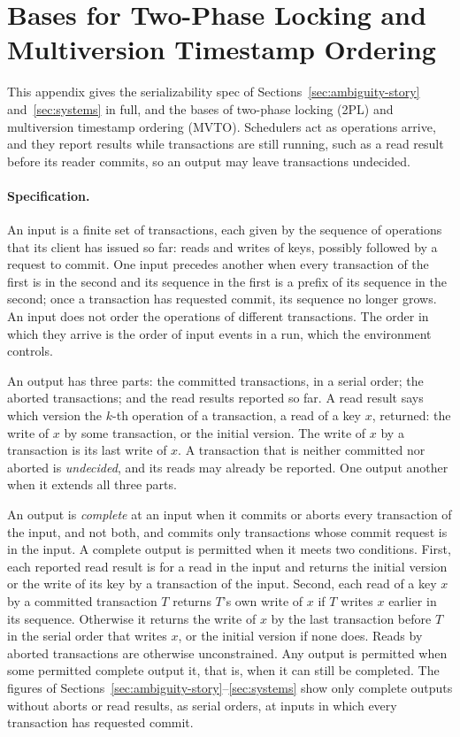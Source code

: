 \section{\Commitment Bases for Two-Phase Locking and Multiversion Timestamp Ordering}
\label{app:cc-bases}

This appendix gives the serializability spec of
Sections~\ref{sec:ambiguity-story} and~\ref{sec:systems} in full, and the
\commitment bases of two-phase locking (2PL) and multiversion timestamp ordering
(MVTO).  Schedulers act as operations arrive, and they report results while
transactions are still running, such as a read result before its reader
commits, so an output may leave transactions undecided.

\paragraph{Specification.}
An input is a finite set of transactions, each given by the sequence of
operations that its client has issued so far: reads and writes of keys,
possibly followed by a request to commit.  One input precedes another when
every transaction of the first is in the second and its sequence in the first
is a prefix of its sequence in the second; once a transaction has requested
commit, its sequence no longer grows.  An input does not order the operations
of different transactions.  The order in which they arrive is the order of
input events in a run, which the environment controls.

An output has three parts: the committed transactions, in a serial order; the
aborted transactions; and the read results reported so far.  A read result
says which version the $k$-th operation of a transaction, a read of a key $x$,
returned: the write of $x$ by some transaction, or the initial version.  The
write of $x$ by a transaction is its last write of $x$.  A transaction that is
neither committed nor aborted is \emph{undecided}, and its reads may already be
reported.  One output \outrel another when it extends all three parts.

An output is \emph{complete} at an input when it commits or aborts every
transaction of the input, and not both, and commits only transactions whose
commit request is in the input.  A complete output is permitted when it meets two
conditions.  First, each reported read result is for a read in the input and
returns the initial version or the write of its key by a transaction of the
input.  Second, each read of a key $x$ by a committed transaction $T$ returns
$T$'s own write of $x$ if $T$ writes $x$ earlier in its sequence.  Otherwise it
returns the write of $x$ by the last transaction before $T$ in the serial order
that writes $x$, or the initial version if none does.  Reads by aborted
transactions are otherwise unconstrained.  Any output is permitted when some permitted complete output
\outrel it, that is, when it can still be completed.  The figures of
Sections~\ref{sec:ambiguity-story}--\ref{sec:systems} show only complete
outputs without aborts or read results, as serial orders, at inputs in which
every transaction has requested commit.

